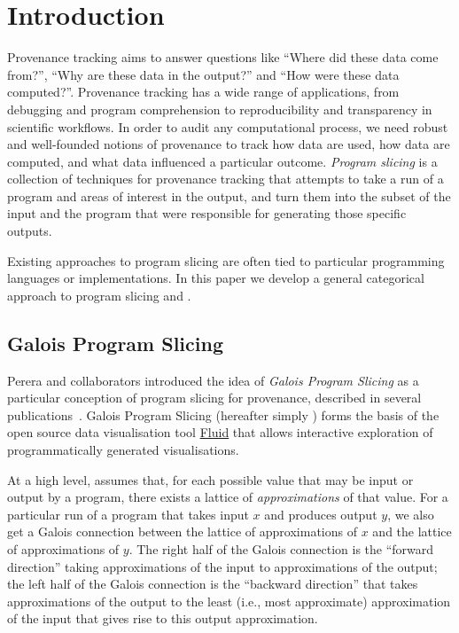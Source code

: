 \section{Introduction}

Provenance tracking aims to answer questions like ``Where did these data come from?'', ``Why are these data in the output?'' and ``How were these data computed?''. Provenance tracking has a wide range of applications, from debugging and program comprehension to reproducibility and transparency in scientific workflows. In order to audit any computational process, we need robust and well-founded notions of provenance to track how data are used, how data are computed, and what data influenced a particular outcome. \emph{Program slicing} is a collection of techniques for provenance tracking that attempts to take a run of a program and areas of interest in the output, and turn them into the subset of the input and the program that were responsible for generating those specific outputs.

Existing approaches to program slicing are often tied to particular programming languages or implementations. In this paper we develop a general categorical approach to program slicing and .

\subsection{Galois Program Slicing}
\label{sec:introduction:galois-slicing}

Perera and collaborators introduced the idea of {\em Galois Program Slicing} as a particular conception of program slicing for provenance, described in several publications~\cite{perera12a,perera16d,ricciotti17}. Galois Program Slicing (hereafter simply {\emph \GPS}) forms the basis of the open source data visualisation tool \href{https://f.luid.org/}{Fluid} that allows interactive exploration of programmatically generated visualisations.

At a high level, \GPS assumes that, for each possible value that may be input or output by a program, there exists a lattice of {\em approximations} of that value. For a particular run of a program that takes input $x$ and produces output $y$, we also get a Galois connection between the lattice of approximations of $x$ and the lattice of approximations of $y$. The right half of the Galois connection is the ``forward direction'' taking approximations of the input to approximations of the output; the left half of the Galois connection is the ``backward direction'' that takes approximations of the output to the least (i.e., most approximate) approximation of the input that gives rise to this output approximation.

